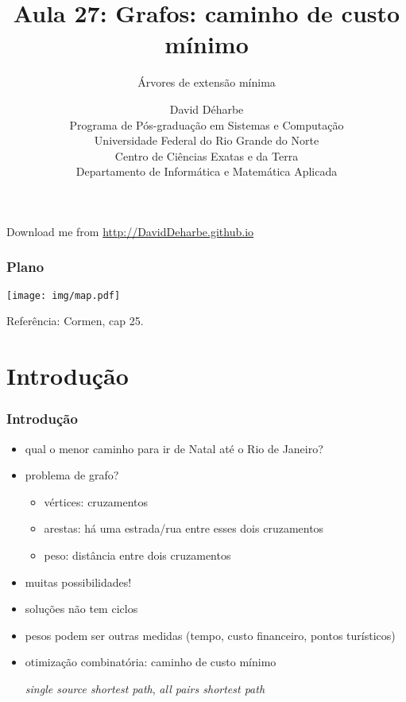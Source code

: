 \documentclass{beamer}
\title{Aula 27: Grafos: caminho de custo mínimo}
\subtitle{Árvores de extensão mínima}
\author{David Déharbe \\
  Programa de Pós-graduação em Sistemas e Computação \\
  Universidade Federal do Rio Grande do Norte \\
  Centro de Ciências Exatas e da Terra \\
  Departamento de Informática e Matemática Aplicada}
\date{}
\begin{document}

\begin{frame}
  \titlepage

  Download me from \url{http://DavidDeharbe.github.io}
\end{frame}

\begin{frame}
  \frametitle{Plano}
\begin{center}
\texttt{[image: img/map.pdf]}
\end{center}
  \tableofcontents
Referência: Cormen, cap 25.
\end{frame}

\section{Introdução}

\begin{frame}
\frametitle{Introdução}

\begin{itemize}
\item qual o menor caminho para ir de Natal até o Rio de Janeiro?
\item problema de grafo?
\begin{itemize}
\item vértices: cruzamentos
\item arestas: há uma estrada/rua entre esses dois cruzamentos
\item peso: distância entre dois cruzamentos
\end{itemize}
\item muitas possibilidades!
\item soluções não tem ciclos
\item pesos podem ser outras medidas (tempo, custo financeiro, pontos turísticos)
\item \alert{otimização combinatória}: caminho de custo mínimo

\textit{single source shortest path},
\textit{all pairs shortest path}
\end{itemize}

\end{frame}
\end{document}
